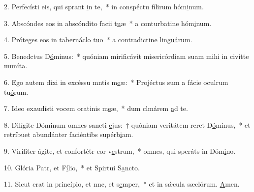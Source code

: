 2. Perfecísti eis, qui sprant \uline{i}n te,~* in conspéctu filirum hóm\uline{i}num.\par 
3. Abscóndes eos in abscóndito facii t\uline{u}æ~* a conturbatine hóm\uline{i}num.\par 
4. Próteges eos in tabernáclo t\uline{u}o~* a contradictine lin\uline{guá}rum.\par 
5. Benedctus D\uline{ó}minus:~* quóniam mirificávit misericórdiam suam mihi in civitte mun\uline{í}ta.\par 
6. Ego autem dixi in excéssu mntis m\uline{e}æ:~* Projéctus sum a fácie oculrum tu\uline{ó}rum.\par 
7. Ideo exaudísti vocem oratinis m\uline{e}æ,~* dum clmárem \uline{a}d te.\par 
8. Dilígite Dóminum omnes sancti \uline{e}jus:~† quóniam veritátem reret D\uline{ó}minus,~* et retríbuet abundánter faciéntibs supérb\uline{i}am.\par 
9. Viríliter ágite, et confortétr cor v\uline{e}strum,~* omnes, qui speráts in Dóm\uline{i}no.\par 
10. Glória Patr, et F\uline{í}lio,~* et Spirtui S\uline{a}ncto.\par 
11. Sicut erat in princípio, et nnc, et s\uline{e}mper,~* et in sǽcula sæclórum. \uline{A}men.\par 
